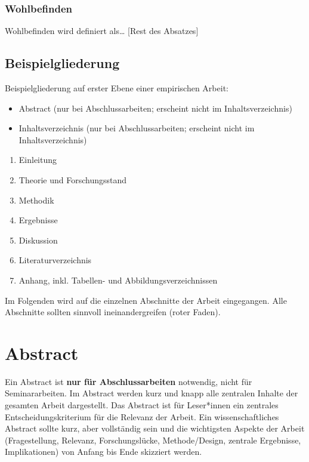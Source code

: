 \documentclass[
  letterpaper,
  DIV=11]{scrreprt}
\begin{document}
\hypertarget{wohlbefinden}{%
\subsubsection{Wohlbefinden}\label{wohlbefinden}}

Wohlbefinden wird definiert als\ldots{} {[}Rest des Absatzes{]}

\hypertarget{beispielgliederung}{%
\subsection{Beispielgliederung}\label{beispielgliederung}}

Beispielgliederung auf erster Ebene einer empirischen Arbeit:

\begin{itemize}
\item
  Abstract (nur bei Abschlussarbeiten; erscheint nicht im
  Inhaltsverzeichnis)
\item
  Inhaltsverzeichnis (nur bei Abschlussarbeiten; erscheint nicht im
  Inhaltsverzeichnis)
\end{itemize}

\begin{enumerate}
\def\labelenumi{\arabic{enumi}.}
\item
  Einleitung
\item
  Theorie und Forschungsstand
\item
  Methodik
\item
  Ergebnisse
\item
  Diskussion
\item
  Literaturverzeichnis
\item
  Anhang, inkl. Tabellen- und Abbildungsverzeichnissen
\end{enumerate}

Im Folgenden wird auf die einzelnen Abschnitte der Arbeit eingegangen.
Alle Abschnitte sollten sinnvoll ineinandergreifen (roter Faden).

\hypertarget{abstract}{%
\section{Abstract}\label{abstract}}

Ein Abstract ist \textbf{nur für Abschlussarbeiten} notwendig, nicht für
Seminararbeiten. Im Abstract werden kurz und knapp alle zentralen
Inhalte der gesamten Arbeit dargestellt. Das Abstract ist für
Leser*innen ein zentrales Entscheidungskriterium für die Relevanz der
Arbeit. Ein wissenschaftliches Abstract sollte kurz, aber vollständig
sein und die wichtigsten Aspekte der Arbeit (Fragestellung, Relevanz,
Forschungslücke, Methode/Design, zentrale Ergebnisse, Implikationen) von
Anfang bis Ende skizziert werden.
\end{document}
